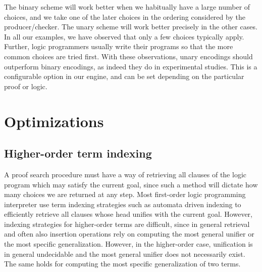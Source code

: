 \documentclass{llncs}
\begin{document}
The binary scheme will work better when we habitually have a large
number of choices, and we take one of the later choices in the
ordering considered by the producer/checker. The unary scheme will
work better precisely in the other cases. In all our examples, we have
observed that only a few choices typically apply. Further, logic
programmers usually write their programs so that the more common
choices are tried first. With these observations, unary encodings
should outperform binary encodings, as indeed they do in experimental
studies. This is a configurable option in our engine, and can be set
depending on the particular proof or logic.

\section{Optimizations}
\subsection{Higher-order term indexing}\label{sec:indexing}

A proof search procedure must have a way of retrieving all clauses of
the logic program which may satisfy the current goal, since such a
method will dictate how many choices we are returned at any step.
Most first-order logic programming interpreter use term indexing
strategies such as automata driven indexing
\cite{Ramakrishnan01:indexing} to efficiently retrieve all clauses
whose head unifies with the current goal.  However, indexing
strategies for higher-order terms are difficult, since in general
retrieval and often also insertion operations rely on computing the
most general unifier or the most specific generalization. However, in
the higher-order case, unification is in general undecidable and the
most general unifier does not necessarily exist. The same holds for
computing the most specific generalization of two terms.
\end{document}
